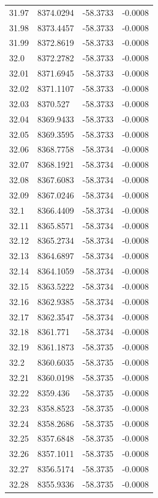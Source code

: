 \begin{table}[H]
\begin{tabular}{llll}
31.97 & 8374.0294 & -58.3733 & -0.0008 \\
31.98 & 8373.4457 & -58.3733 & -0.0008 \\
31.99 & 8372.8619 & -58.3733 & -0.0008 \\
32.0 & 8372.2782 & -58.3733 & -0.0008 \\
32.01 & 8371.6945 & -58.3733 & -0.0008 \\
32.02 & 8371.1107 & -58.3733 & -0.0008 \\
32.03 & 8370.527 & -58.3733 & -0.0008 \\
32.04 & 8369.9433 & -58.3733 & -0.0008 \\
32.05 & 8369.3595 & -58.3733 & -0.0008 \\
32.06 & 8368.7758 & -58.3734 & -0.0008 \\
32.07 & 8368.1921 & -58.3734 & -0.0008 \\
32.08 & 8367.6083 & -58.3734 & -0.0008 \\
32.09 & 8367.0246 & -58.3734 & -0.0008 \\
32.1 & 8366.4409 & -58.3734 & -0.0008 \\
32.11 & 8365.8571 & -58.3734 & -0.0008 \\
32.12 & 8365.2734 & -58.3734 & -0.0008 \\
32.13 & 8364.6897 & -58.3734 & -0.0008 \\
32.14 & 8364.1059 & -58.3734 & -0.0008 \\
32.15 & 8363.5222 & -58.3734 & -0.0008 \\
32.16 & 8362.9385 & -58.3734 & -0.0008 \\
32.17 & 8362.3547 & -58.3734 & -0.0008 \\
32.18 & 8361.771 & -58.3734 & -0.0008 \\
32.19 & 8361.1873 & -58.3735 & -0.0008 \\
32.2 & 8360.6035 & -58.3735 & -0.0008 \\
32.21 & 8360.0198 & -58.3735 & -0.0008 \\
32.22 & 8359.436 & -58.3735 & -0.0008 \\
32.23 & 8358.8523 & -58.3735 & -0.0008 \\
32.24 & 8358.2686 & -58.3735 & -0.0008 \\
32.25 & 8357.6848 & -58.3735 & -0.0008 \\
32.26 & 8357.1011 & -58.3735 & -0.0008 \\
32.27 & 8356.5174 & -58.3735 & -0.0008 \\
32.28 & 8355.9336 & -58.3735 & -0.0008 \\

\end{tabular}
\end{table}
